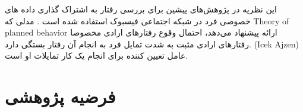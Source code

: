   این نظریه در پژوهش‌های پیشین برای بررسی رفتار
  به اشتراک گذاری داده های خصوصی
  فرد در شبکه اجتماعی فیسبوک استفاده شده است
  \!\cite{vanderschyffInformationPrivacyBehavior2020}
  \!.
  مدلی که
  \!\gls{Theory of planned behavior}
  ارائه پیشنهاد می‌دهد، احتمال وقوع  رفتار‌های ارادی مخصوصا رفتار‌های ارادی مثبت به شدت تمایل فرد به
  انجام آن رفتار بستگی دارد.
  \!({\gls{Icek Ajzen}})
  عامل تعیین کننده برای انجام یک کار تمایلات او است.
\fi



\section{فرضیه پژوهشی}



